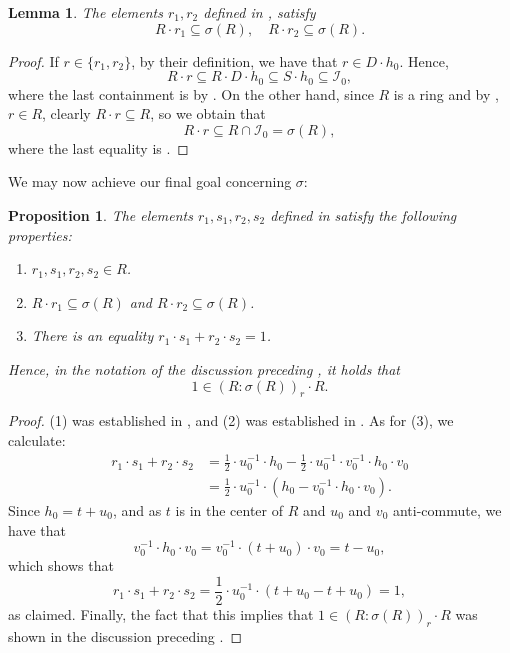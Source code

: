 \documentclass{amsart}
\newtheorem{prop}[equation]{Proposition}
\newtheorem{lem}[equation]{Lemma}
\theoremstyle{definition}
\numberwithin{equation}{section}
\begin{document}
\begin{lem}\label{lem:Rrinsigma}
The elements $r_1, r_2$ defined in ,
satisfy
\[
R\cdot r_1 \subseteq \sigma(R), \quad R\cdot r_2 \subseteq \sigma(R).
\]
\end{lem}
\begin{proof}
If $r \in \{r_1,r_2\}$,
by their definition, we have that $r \in D\cdot h_0$.
Hence,
\[
R \cdot r \subseteq R \cdot D \cdot h_0 \subseteq S \cdot h_0 \subseteq \mathcal{I}_0, 
\]
where the last containment is by .
On the other hand, since $R$ is a ring and by ,
$r \in R$, clearly $R\cdot r \subseteq R$,
so we obtain that
\[
R \cdot r \subseteq R \cap \mathcal{I}_0 = \sigma(R),
\]
where the last equality is .
\end{proof}

We may now achieve our final goal concerning $\sigma$:
\begin{prop}\label{prop:conductor}
The elements $r_1,s_1,r_2,s_2$ defined in  satisfy the following properties:
\begin{enumerate}
\item $r_1,s_1,r_2,s_2 \in R$.
\item $R\cdot r_1 \subseteq \sigma(R)$ and $R\cdot r_2 \subseteq \sigma(R)$.
\item There is an equality $r_1\cdot s_1 + r_2 \cdot s_2 = 1$.
\end{enumerate}
Hence, in the notation of the discussion preceding ,
it holds that 
\[
1 \in (R:\sigma(R))_r\cdot R.
\]
\end{prop}
\begin{proof}
(1) was established in ,
and (2) was established in .
As for (3), we calculate:
\begin{align*}
r_1\cdot s_1 + r_2 \cdot s_2 &= 
\frac{1}{2}\cdot u_0^{-1}\cdot h_0 -\frac{1}{2}\cdot u_0^{-1}\cdot v_0^{-1}\cdot h_0 \cdot v_0 \\ &= \frac{1}{2}\cdot u_0^{-1} \cdot \left(h_0 - v_0^{-1}\cdot h_0 \cdot v_0 \right).
\end{align*}
Since $h_0 = t + u_0$,
and as $t$ is in the center of $R$ and $u_0$ and $v_0$ anti-commute,
we have that
\[
v_0^{-1}\cdot h_0 \cdot v_0 = v_0^{-1}\cdot (t + u_0) \cdot v_0 = 
t - u_0,
\]
which shows that 
\[
r_1\cdot s_1 + r_2 \cdot s_2 = 
\frac{1}{2}\cdot u_0^{-1} \cdot \left( t+u_0 -t + u_0\right) = 1,
\]
as claimed.
Finally, the fact that this implies that $1 \in (R:\sigma(R))_r\cdot R$ was shown in the discussion preceding .
\end{proof}
\end{document}
